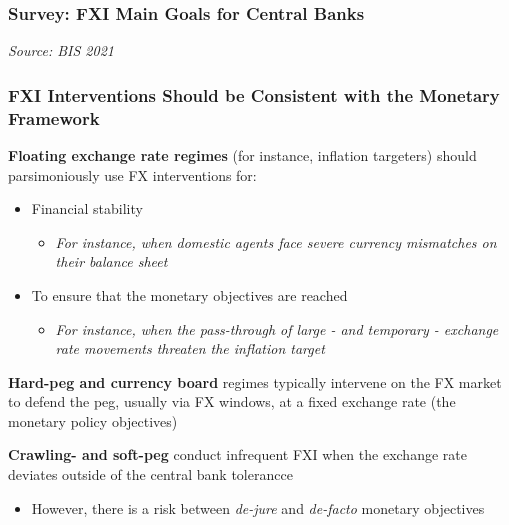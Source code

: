 \documentclass{beamer}
\newenvironment{wideitemize}{\itemize\addtolength{\itemsep}{10pt}}{\enditemize}
\begin{document}
\begin{frame}
\frametitle{Survey: FXI Main Goals for Central Banks}
\medskip
\emph{Source: BIS 2021 \href{https://www.bis.org/publ/bppdf/bispap104b_rh.pdf}{}}
\end{frame}


\begin{frame}
  \frametitle{FXI Interventions Should be Consistent with the Monetary Framework}
  
  \begin{wideitemize}
  \item \textbf{Floating exchange rate regimes} (for instance, inflation targeters) should parsimoniously use FX interventions for:
    \begin{itemize}
    \item Financial stability
      \begin{itemize}
      \item \emph{For instance, when domestic agents face severe currency mismatches on their balance sheet}
      \end{itemize}
    \item To ensure that the monetary objectives are reached
          \begin{itemize}
      \item \emph{For instance, when the pass-through of large  - and temporary - exchange rate movements threaten the inflation target}
      \end{itemize}
    \end{itemize}
   
    \item \textbf{Hard-peg and currency board} regimes typically intervene on the FX market to defend the peg, usually via FX windows, at a fixed exchange rate (the monetary policy objectives)

    \item \textbf{Crawling- and soft-peg} conduct infrequent FXI when the exchange rate deviates outside of the central bank tolerancce
      \begin{itemize}
      \item However, there is a risk between \emph{de-jure} and \emph{de-facto} monetary objectives
      \end{itemize}
    \end{wideitemize}
\end{frame}
\end{document}
